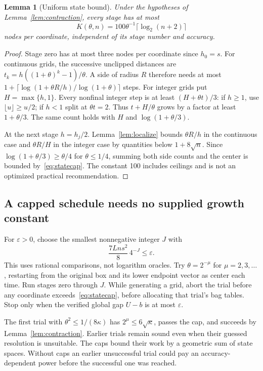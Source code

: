 \documentclass[11pt]{article}
\newtheorem{lemma}[theorem]{Lemma}
\theoremstyle{remark}
\begin{document}
\begin{lemma}[Uniform state bound]\label{lem:states}
Under the hypotheses of Lemma~\ref{lem:contraction}, every stage has at
most
\begin{equation}\label{eq:statecap}
K(\theta,n)=100\theta^{-1}\lceil\log_2(n+2)\rceil
\end{equation}
nodes per coordinate, independent of its stage number and accuracy.
\end{lemma}
\begin{proof}
Stage zero has at most three nodes per coordinate since $h_0=s$.
For continuous grids, the successive unclipped distances are
$t_k=h((1+\theta)^k-1)/\theta$. A side of radius $R$ therefore needs
at most $1+\lceil\log(1+\theta R/h)/\log(1+\theta)\rceil$ steps.
For integer grids put $H=\max\{h,1\}$. Every nonfinal integer step is
at least $(H+\theta t)/3$: if $h\ge1$, use
$\lfloor u\rfloor\ge u/2$; if $h<1$ split at $\theta t=2$.
Thus $t+H/\theta$ grows by a factor at least $1+\theta/3$.
The same count holds with $H$ and $\log(1+\theta/3)$.

At the next stage $h=h_j/2$. Lemma~\ref{lem:localize} bounds
$\theta R/h$ in the continuous case and $\theta R/H$ in the integer
case by quantities below $1+8\sqrt n$. Since
$\log(1+\theta/3)\ge\theta/4$ for $\theta\le1/4$, summing both
side counts and the center is bounded by~\eqref{eq:statecap}.
The constant 100 includes ceilings and is not an optimized practical
recommendation.
\end{proof}

\subsection{A capped schedule needs no supplied growth constant}

For $\varepsilon>0$, choose the smallest nonnegative integer $J$ with
\begin{equation}\label{eq:stagebudget}
\frac{7Lns^2}{8}\,4^{-J}\le\varepsilon.
\end{equation}
This uses rational comparisons, not logarithm oracles. Try
$\theta=2^{-\mu}$ for $\mu=2,3,\ldots$, restarting from the original
box and its lower endpoint vector as center each time. Run stages zero
through $J$. While generating a grid,
abort the trial before any coordinate exceeds~\eqref{eq:statecap},
before allocating that trial's bag tables. Stop only when the verified
global gap $U-b$ is at most $\varepsilon$.

The first trial with $\theta^2\le1/(8\kappa)$ has
$2^\mu\le6\sqrt\kappa$, passes the cap, and succeeds by
Lemma~\ref{lem:contraction}. Earlier trials remain sound even when their
guessed resolution is unsuitable. The caps bound their work by a geometric
sum of state spaces. Without caps an earlier unsuccessful trial could
pay an accuracy-dependent power before the successful one was reached.
\end{document}
